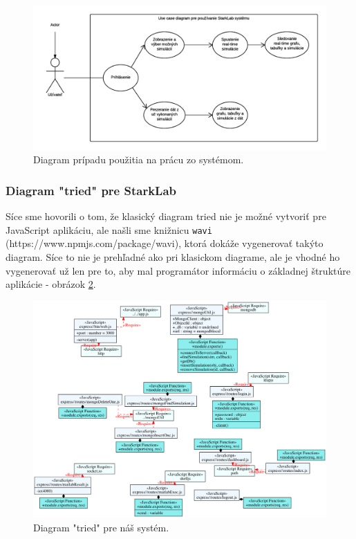 \begin{figure}[H]
  \centering
  \includegraphics[scale=0.7]{img/diagrams/use-case.png}
  \caption{Diagram prípadu použitia na prácu zo systémom.}
  \label{img-use-case}
\end{figure}

\subsubsection{Diagram "tried" pre StarkLab}
Síce sme hovorili o tom, že klasický diagram tried nie je možné vytvoriť pre JavaScript aplikáciu, ale našli sme knižnicu \verb|wavi| (https://www.npmjs.com/package/wavi), ktorá dokáže vygenerovať takýto diagram. Síce to nie je prehľadné ako pri klasickom diagrame, ale je vhodné ho vygenerovať už len pre to, aby mal programátor informáciu o základnej štruktúre aplikácie - obrázok \ref{img-class-diagram}.

\begin{figure}[H]
  \centering
  \includegraphics[scale=0.34]{img/diagrams/class.png}
  \caption{Diagram "tried" pre náš systém.}
  \label{img-class-diagram}
\end{figure}

